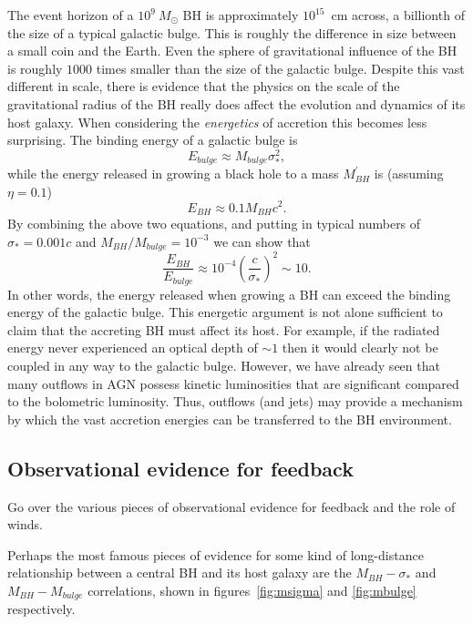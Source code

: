The event horizon of a $10^9~M_\odot$ BH is approximately 
$10^{15}$~cm across, a billionth of the size of a typical galactic bulge. This is 
roughly the difference in size between a small coin and the 
Earth. Even the sphere of gravitational influence of the BH is roughly 
$1000$ times smaller than the size of the galactic bulge.
Despite this vast different in scale, there is evidence
that the physics on the scale of the gravitational
radius of the BH really does affect the evolution and dynamics of its host galaxy.
When considering the {\em energetics} of accretion this becomes less surprising.
The binding energy of a galactic bulge is 
\begin{equation}
E_{bulge} \approx M_{bulge} \sigma_*^2,
\end{equation}
while the energy released in growing a black hole to a 
mass $M_{BH}^\prime$ is (assuming $\eta=0.1$)
\begin{equation}
E_{BH} \approx 0.1 M_{BH} c^2.  
\end{equation}
By combining the above two equations, and putting in typical numbers of
$\sigma_* = 0.001c$ and $M_{BH} / M_{bulge} = 10^{-3}$ we can show that 
\begin{equation}
\frac{E_{BH}}{E_{bulge}} \approx 10^{-4} \left( \frac{c}{\sigma_*} \right)^2 \sim 10.
\end{equation}
In other words, the energy released when growing a BH can exceed
the binding energy of the galactic bulge. This energetic 
argument is not alone sufficient to claim that the accreting BH must affect its
host. For example, if the radiated energy never experienced an 
optical depth of $\sim 1$ then it would clearly not be coupled in 
any way to the galactic bulge. However,
we have already seen that many outflows in AGN possess kinetic luminosities that
are significant compared to the bolometric luminosity. Thus, outflows 
(and jets) may provide a mechanism by which the vast accretion energies can
be transferred to the BH environment.

\subsection{Observational evidence for feedback}

{
\color{blue}
Go over the various pieces of observational evidence for feedback
and the role of winds.
}
\bigskip

Perhaps the most famous pieces of evidence for some kind of long-distance 
relationship between a central BH and its host galaxy are the 
$M_{BH}-\sigma_*$ and $M_{BH}-M_{bulge}$ correlations, shown in figures~\ref{fig:msigma}
and \ref{fig:mbulge} respectively.

